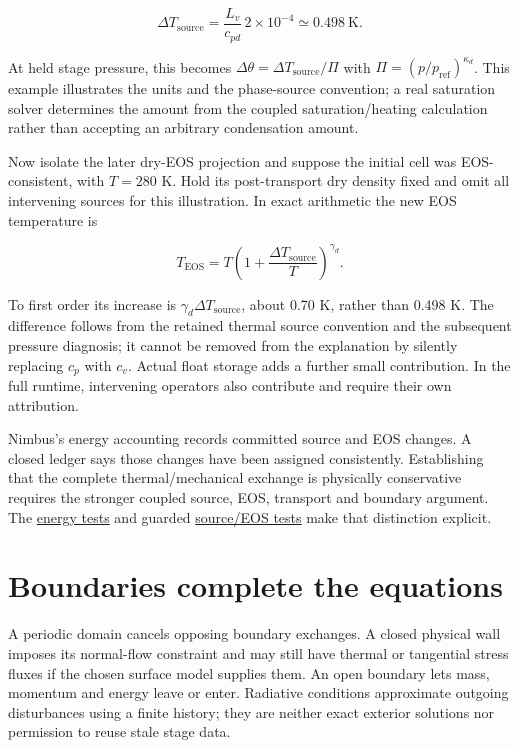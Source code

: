 \documentclass[
  11pt,
]{report}
\begin{document}
\[\Delta T_{\mathrm{source}}
=\frac{L_v}{c_{pd}}\,2\times10^{-4}\simeq0.498\ \mathrm{K}.\]

At held stage pressure, this becomes
\(\Delta\theta=\Delta T_{\mathrm{source}}/\Pi\) with
\(\Pi=(p/p_{\mathrm{ref}})^{\kappa_d}\). This example illustrates the
units and the phase-source convention; a real saturation solver
determines the amount from the coupled saturation/heating calculation
rather than accepting an arbitrary condensation amount.

Now isolate the later dry-EOS projection and suppose the initial cell
was EOS-consistent, with \(T=280\) K. Hold its post-transport dry
density fixed and omit all intervening sources for this illustration. In
exact arithmetic the new EOS temperature is

\[T_{\mathrm{EOS}}=T
\left(1+\frac{\Delta T_{\mathrm{source}}}{T}\right)^{\gamma_d}.\]

To first order its increase is \(\gamma_d\Delta T_{\mathrm{source}}\),
about 0.70 K, rather than 0.498 K. The difference follows from the
retained thermal source convention and the subsequent pressure
diagnosis; it cannot be removed from the explanation by silently
replacing \(c_p\) with \(c_v\). Actual float storage adds a further
small contribution. In the full runtime, intervening operators also
contribute and require their own attribution.

Nimbus's energy accounting records committed source and EOS changes. A
closed ledger says those changes have been assigned consistently.
Establishing that the complete thermal/mechanical exchange is physically
conservative requires the stronger coupled source, EOS, transport and
boundary argument. The
\href{../tests/diagnostics/test_energy_budget.cpp}{energy tests} and
guarded
\href{../tests/physics/test_milbrandt_triple_source_eos_energy.cpp}{source/EOS
tests} make that distinction explicit.

\section{Boundaries complete the
equations}\label{boundaries-complete-the-equations}

A periodic domain cancels opposing boundary exchanges. A closed physical
wall imposes its normal-flow constraint and may still have thermal or
tangential stress fluxes if the chosen surface model supplies them. An
open boundary lets mass, momentum and energy leave or enter. Radiative
conditions approximate outgoing disturbances using a finite history;
they are neither exact exterior solutions nor permission to reuse stale
stage data.
\end{document}
